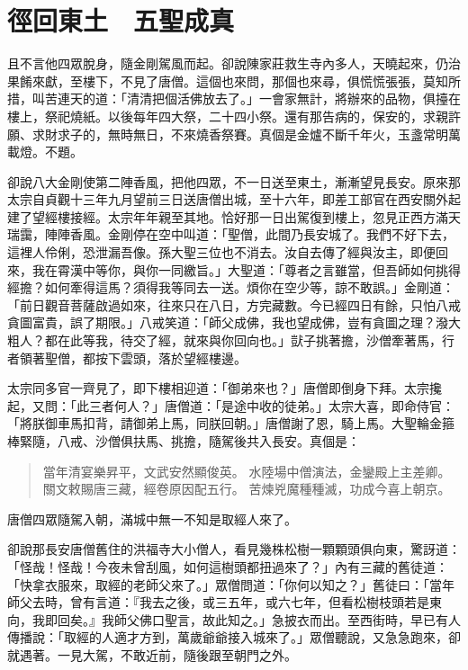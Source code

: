 
\chapter{徑回東土　五聖成真}

且不言他四眾脫身，隨金剛駕風而起。卻說陳家莊救生寺內多人，天曉起來，仍治果餚來獻，至樓下，不見了唐僧。這個也來問，那個也來尋，俱慌慌張張，莫知所措，叫苦連天的道：「清清把個活佛放去了。」一會家無計，將辦來的品物，俱擡在樓上，祭祀燒紙。以後每年四大祭，二十四小祭。還有那告病的，保安的，求親許願、求財求子的，無時無日，不來燒香祭賽。真個是金爐不斷千年火，玉盞常明萬載燈。不題。

卻說八大金剛使第二陣香風，把他四眾，不一日送至東土，漸漸望見長安。原來那太宗自貞觀十三年九月望前三日送唐僧出城，至十六年，即差工部官在西安關外起建了望經樓接經。太宗年年親至其地。恰好那一日出駕復到樓上，忽見正西方滿天瑞靄，陣陣香風。金剛停在空中叫道：「聖僧，此間乃長安城了。我們不好下去，這裡人伶俐，恐泄漏吾像。孫大聖三位也不消去。汝自去傳了經與汝主，即便回來，我在霄漢中等你，與你一同繳旨。」大聖道：「尊者之言雖當，但吾師如何挑得經擔？如何牽得這馬？須得我等同去一送。煩你在空少等，諒不敢誤。」金剛道：「前日觀音菩薩啟過如來，往來只在八日，方完藏數。今已經四日有餘，只怕八戒貪圖富貴，誤了期限。」八戒笑道：「師父成佛，我也望成佛，豈有貪圖之理？潑大粗人？都在此等我，待交了經，就來與你回向也。」獃子挑著擔，沙僧牽著馬，行者領著聖僧，都按下雲頭，落於望經樓邊。

太宗同多官一齊見了，即下樓相迎道：「御弟來也？」唐僧即倒身下拜。太宗攙起，又問：「此三者何人？」唐僧道：「是途中收的徒弟。」太宗大喜，即命侍官：「將朕御車馬扣背，請御弟上馬，同朕回朝。」唐僧謝了恩，騎上馬。大聖輪金箍棒緊隨，八戒、沙僧俱扶馬、挑擔，隨駕後共入長安。真個是：
\begin{quote}
當年清宴樂昇平，文武安然顯俊英。
水陸場中僧演法，金鑾殿上主差卿。
關文敕賜唐三藏，經卷原因配五行。
苦煉兇魔種種滅，功成今喜上朝京。
\end{quote}

唐僧四眾隨駕入朝，滿城中無一不知是取經人來了。

卻說那長安唐僧舊住的洪福寺大小僧人，看見幾株松樹一顆顆頭俱向東，驚訝道：「怪哉！怪哉！今夜未曾刮風，如何這樹頭都扭過來了？」內有三藏的舊徒道：「快拿衣服來，取經的老師父來了。」眾僧問道：「你何以知之？」舊徒曰：「當年師父去時，曾有言道：『我去之後，或三五年，或六七年，但看松樹枝頭若是東向，我即回矣。』我師父佛口聖言，故此知之。」急披衣而出。至西街時，早已有人傳播說：「取經的人適才方到，萬歲爺爺接入城來了。」眾僧聽說，又急急跑來，卻就遇著。一見大駕，不敢近前，隨後跟至朝門之外。

